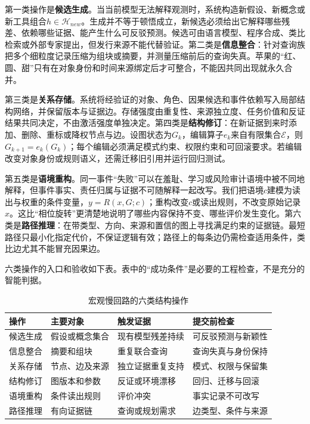 第一类操作是\textbf{候选生成}。当当前模型无法解释观测时，系统构造新假设、新概念或新工具组合$h\in\mathcal{H}_{new}$。生成并不等于顿悟成立，新候选必须给出它解释哪些残差、依赖哪些证据、能产生什么可反驳预测。候选可由语言模型、程序合成、类比检索或外部专家提出，但发行来源不能代替验证。第二类是\textbf{信息整合}：针对查询族把多个细粒度记录压缩为组块或摘要，并测量压缩前后的查询失真。苹果的“红、圆、甜”只有在对象身份和时间来源绑定后才可整合，不能因共同出现就永久合并。

第三类是\textbf{关系存储}。系统将经验证的对象、角色、因果候选和事件依赖写入局部结构网络，并保留版本与证据边。存储强度由重复性、来源独立度、任务价值和反证结果共同决定，不由激活强度单独决定。第四类是\textbf{结构修订}：在新证据到来时添加、删除、重标或降权节点与边。设图状态为$G_k$，编辑算子$e_k$来自有限集合$\mathcal{E}$，则$G_{k+1}=e_k(G_k)$；每个编辑必须满足模式约束、权限约束和可回滚要求。若编辑改变对象身份或规则语义，还需迁移旧引用并运行回归测试。

第五类是\textbf{语境重构}。同一事件“失败”可以在羞耻、学习或风险审计语境中被不同地解释，但事件事实、责任归属与证据不可随解释一起改写。我们把语境$c$建模为读出与权重的条件变量，$y=R(x,G;c)$；重构改变$c$或读出规则，不改变原始记录$x$。这比“相位旋转”更清楚地说明了哪些内容保持不变、哪些评价发生变化。第六类是\textbf{路径推理}：在带类型、方向、来源和置信的图上寻找满足约束的证据链。最短路径只最小化指定代价，不保证逻辑有效；路径上的每条边仍需检查适用条件，类比边尤其不能冒充因果边。

六类操作的入口和验收如下表。表中的“成功条件”是必要的工程检查，不是充分的智能判据。
\begin{table}[htbp]
\centering
\footnotesize
\begin{tabularx}{\textwidth}{l X X X}
\toprule
\rowcolor{structurecolor!20} 操作 & 主要对象 & 触发证据 & 提交前检查 \\
\midrule
候选生成 & 假设或概念集合 & 现有模型残差持续 & 可反驳预测与新颖性 \\
信息整合 & 摘要和组块 & 重复联合查询 & 查询失真与身份保持 \\
关系存储 & 节点、边及来源 & 独立证据重复支持 & 模式、权限与保留集 \\
结构修订 & 图版本和参数 & 反证或环境漂移 & 回归、迁移与回滚 \\
语境重构 & 条件读出规则 & 评价冲突 & 事实记录不可改写 \\
路径推理 & 有向证据链 & 查询或规划需求 & 边类型、条件与来源 \\
\bottomrule
\end{tabularx}
\caption{宏观慢回路的六类结构操作}
\end{table}

